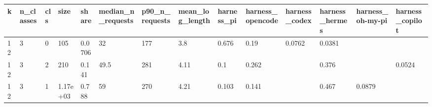 \begin{tabular}{llllllllllllll}
\toprule
k & n\_classes & cls & size & share & median\_n\_requests & p90\_n\_requests & mean\_log\_length & harness\_pi & harness\_opencode & harness\_codex & harness\_hermes & harness\_oh-my-pi & harness\_copilot \\
\midrule
12 & 3 & 0 & 105 & 0.0706 & 32 & 177 & 3.8 & 0.676 & 0.19 & 0.0762 & 0.0381 &  &  \\
12 & 3 & 2 & 210 & 0.141 & 49.5 & 281 & 4.11 & 0.1 & 0.262 &  & 0.376 &  & 0.0524 \\
12 & 3 & 1 & 1.17e+03 & 0.788 & 59 & 270 & 4.21 & 0.103 & 0.141 &  & 0.467 & 0.0879 &  \\
\bottomrule
\end{tabular}